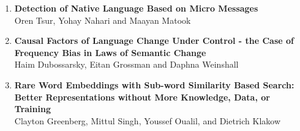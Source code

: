 \documentclass[a0,portrait]{a0poster}
\begin{document}
{\begin{enumerate}
        \textbf{Semantically Motivated Hebrew Verb-Noun Multi-Word Expressions
        Identification}\\
        Chaya Liebeskind and Yaakov Hacohen-Kerner
        \item
        \textbf{Detection of Native Language Based on Micro Messages}\\
        Oren Tsur, Yohay Nahari and Maayan Matook
        \item
        \textbf{Causal Factors of Language Change Under Control - the Case of Frequency Bias in Laws of Semantic
        Change}\\
        Haim Dubossarsky, Eitan Grossman and Daphna Weinshall
        \item
        \textbf{Rare Word Embeddings with Sub-word Similarity Based Search: Better Representations without More
        Knowledge, Data, or Training}\\
        Clayton Greenberg, Mittul Singh, Youssef Oualil, and Dietrich Klakow
    \end{enumerate}
    }
\end{document}
